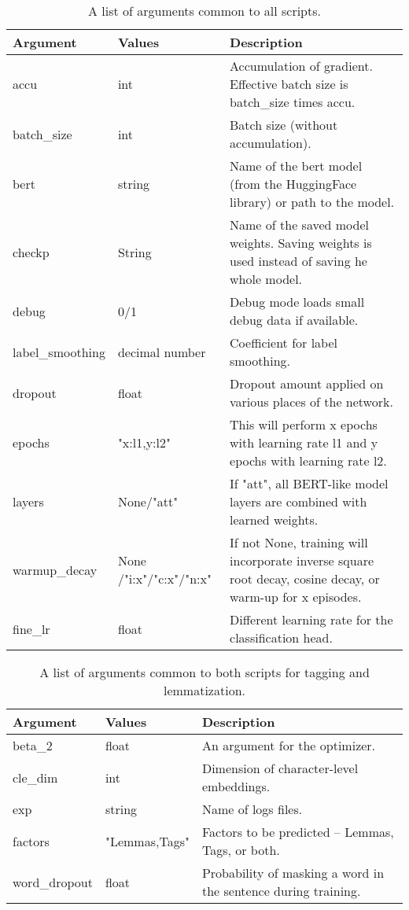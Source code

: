 \begin{table}
\begin{tabular}{ |p{3cm}|p{}|p{6cm}| } 
 \hline
 Argument & Values & Description \\ 
 \hline \hline
 accu & int & Accumulation of gradient. Effective batch size is batch\_size times accu.  \\\hline
batch\_size & int & Batch size (without accumulation). \\ \hline
bert & string & Name of the bert model (from the HuggingFace library) or path to the model.  \\ \hline
  checkp & String & Name of the saved model weights. Saving weights is used instead of saving he whole model.  \\ \hline
  debug & 0/1 & Debug mode loads small debug data if available. \\ \hline
  label\_smoothing & decimal number & Coefficient for label smoothing. \\ \hline
  dropout & float &  Dropout amount applied on various places of the network.  \\ \hline
 epochs & "x:l1,y:l2"  & This will perform x epochs with learning rate l1 and y epochs with learning rate l2.   \\ \hline
 layers & None/"att" & If "att", all BERT-like model layers are combined with learned weights.  \\ \hline
 warmup\_decay & None /"i:x"/"c:x"/"n:x" & If not None, training will incorporate inverse square root decay, cosine decay, or warm-up for x episodes.  \\ \hline
 fine\_lr & float & Different learning rate for the classification head.  \\ \hline
 \hline
\end{tabular}
\caption{A list of arguments common to all scripts.} 
\label{Tab:com_args}
\end{table}


\begin{table}
\centering
\begin{tabular}{ |p{3cm}|p{}|p{6cm}| } 
 \hline
 Argument & Values & Description \\ 
 \hline \hline
 beta\_2 & float & An argument for the optimizer. \\ \hline
 cle\_dim & int & Dimension of character-level embeddings.  \\ \hline
 exp & string & Name of logs files.  \\ \hline
 factors & "Lemmas,Tags" & Factors to be predicted -- Lemmas, Tags, or both. \\ \hline
word\_dropout & float & Probability of masking a word in the sentence during training.  \\ \hline

\hline

\end{tabular}
\caption{A list of arguments common to both scripts for tagging and lemmatization.} 
\label{Tab:mt_com_args}
\end{table}


